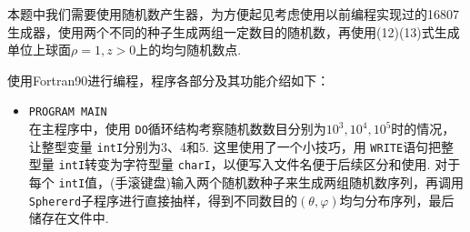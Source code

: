 \documentclass[12pt,a4paper,utf8]{ctexart}
\begin{document}
本题中我们需要使用随机数产生器，为方便起见考虑使用以前编程实现过的16807生成器，使用两个不同的种子生成两组一定数目的随机数，再使用(12)(13)式生成单位上球面$\rho=1,z>0$上的均匀随机数点.

使用Fortran90进行编程，程序各部分及其功能介绍如下：
\begin{itemize} 
    \item \texttt{PROGRAM MAIN}\\
        在主程序中，使用
        \texttt{DO}循环结构考察随机数数目分别为$10^3,10^4,10^5$时的情况，让整型变量
        \texttt{intI}分别为3、4和5. 这里使用了一个小技巧，用
        \texttt{WRITE}语句把整型量
        \texttt{intI}转变为字符型量
        \texttt{charI}，以便写入文件名便于后续区分和使用. 对于每个
        \texttt{intI}值，(手滚键盘)输入两个随机数种子来生成两组随机数序列，再调用
        \texttt{Sphererd}子程序进行直接抽样，得到不同数目的$(\theta,
        \varphi)$均匀分布序列，最后储存在文件中.


\end{itemize}
\end{document}
